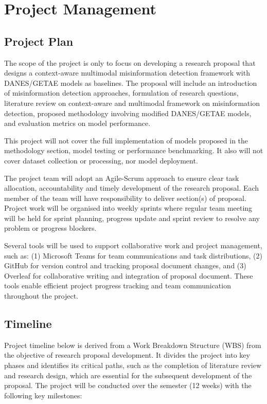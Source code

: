 \section{Project Management}

\subsection{Project Plan}
The scope of the project is only to focus on developing a research proposal that designs a context-aware multimodal misinformation detection framework with DANES/GETAE models as baselines.
The proposal will include an introduction of misinformation detection approaches, formulation of research questions, literature review on context-aware and multimodal framework on misinformation detection, proposed methodology involving modified DANES/GETAE models,
and evaluation metrics on model performance.

This project will not cover the full implementation of models proposed in the methodology section, model testing or performance benchmarking.
It also will not cover dataset collection or processing, nor model deployment.

The project team will adopt an Agile-Scrum approach to ensure clear task allocation, accountability and timely development of the research proposal.
Each member of the team will have responsibility to deliver section(s) of proposal.
Project work will be organised into weekly sprints where regular team meeting will be held for sprint planning, progress update and sprint review to resolve any problem or progress blockers.

Several tools will be used to support collaborative work and project management, such as:
(1) Microsoft Teams for team communications and task distributions,
(2) GitHub for version control and tracking proposal document changes, and
(3) Overleaf for collaborative writing and integration of proposal document.
These tools enable efficient project progress tracking and team communication throughout the project.

\subsection{Timeline}
Project timeline below is derived from a Work Breakdown Structure (WBS) from the objective of research proposal development.
It divides the project into key phases and identifies its critical paths, such as the completion of literature review and research design, which are essential for the subsequent development of the proposal.
The project will be conducted over the semester (12 weeks) with the following key milestones:

